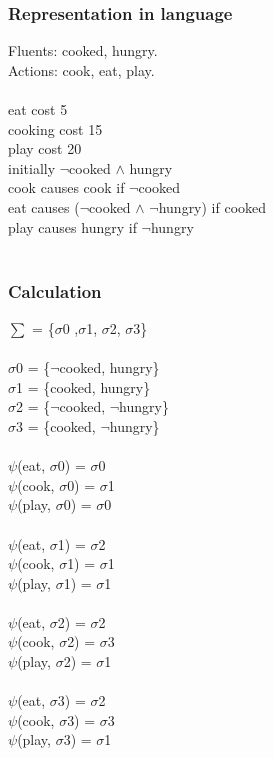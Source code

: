 \documentclass[11pt]{article}
\begin{document}
	\subsubsection{Representation in language}\label{par:p203}
	Fluents: cooked, hungry.\\
	Actions: cook, eat, play.\\
	\\
	eat cost 5\\
	cooking cost 15\\
	play cost 20\\
	initially $\neg$cooked $\land$ hungry\\
	cook causes cook if $\neg$cooked\\
	eat causes ($\neg$cooked $\land$ $\neg$hungry) if cooked\\
	play causes hungry if $\neg$hungry\\
	\\
	\subsubsection{Calculation}\label{par:p303}
	$\sum$ = \{$\sigma$0 ,$\sigma$1, $\sigma$2, $\sigma$3\}\\
	\\
	$\sigma$0 = \{$\neg$cooked, hungry\}\\
	$\sigma$1 = \{cooked, hungry\}\\
	$\sigma$2 = \{$\neg$cooked, $\neg$hungry\}\\
	$\sigma$3 = \{cooked, $\neg$hungry\}\\
	\\
	$\psi$(eat, $\sigma$0) = $\sigma$0\\
	$\psi$(cook, $\sigma$0) = $\sigma$1\\
	$\psi$(play, $\sigma$0) = $\sigma$0\\
	\\
	$\psi$(eat, $\sigma$1) = $\sigma$2\\
	$\psi$(cook, $\sigma$1) = $\sigma$1\\
	$\psi$(play, $\sigma$1) = $\sigma$1\\
	\\
	$\psi$(eat, $\sigma$2) = $\sigma$2\\
	$\psi$(cook, $\sigma$2) = $\sigma$3\\
	$\psi$(play, $\sigma$2) = $\sigma$1\\
	\\
	$\psi$(eat, $\sigma$3) = $\sigma$2\\
	$\psi$(cook, $\sigma$3) = $\sigma$3\\
	$\psi$(play, $\sigma$3) = $\sigma$1\\
	\\
\end{document}

